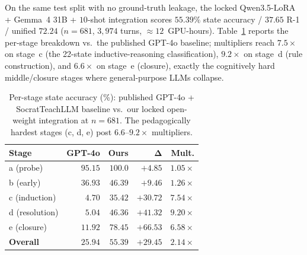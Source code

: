 \documentclass[11pt]{article}
\begin{document}
On the same test split with no ground-truth leakage, the locked Qwen3.5-LoRA + Gemma~4 31B + $10$-shot integration scores $\mathbf{55.39\%}$ state accuracy / $\mathbf{37.65}$ R-1 / unified $\mathbf{72.24}$ ($n{=}681$, $3{,}974$ turns, $\approx 12$~GPU-hours). Table~\ref{tab:perstage} reports the per-stage breakdown vs.\ the published GPT-4o baseline; multipliers reach $\mathbf{7.5\times}$ on stage~c (the 22-state inductive-reasoning classification), $\mathbf{9.2\times}$ on stage~d (rule construction), and $\mathbf{6.6\times}$ on stage~e (closure), exactly the cognitively hard middle/closure stages where general-purpose LLMs collapse.

\begin{table}[t]
  \centering
  \small
  \begin{tabular}{@{}lrrrr@{}}
    \toprule
    \textbf{Stage} & \textbf{GPT-4o} & \textbf{Ours} & $\boldsymbol{\Delta}$ & \textbf{Mult.} \\
    \midrule
    a (probe)       & $95.15$ & $100.0$ & $+4.85$ & $1.05\times$ \\
    b (early)       & $36.93$ & $46.39$ & $+9.46$ & $1.26\times$ \\
    c (induction)   & $\phantom{0}4.70$ & $\mathbf{35.42}$ & $\mathbf{+30.72}$ & $\mathbf{7.54\times}$ \\
    d (resolution)  & $\phantom{0}5.04$ & $\mathbf{46.36}$ & $\mathbf{+41.32}$ & $\mathbf{9.20\times}$ \\
    e (closure)     & $11.92$ & $\mathbf{78.45}$ & $\mathbf{+66.53}$ & $\mathbf{6.58\times}$ \\
    \midrule
    \textbf{Overall} & $\mathbf{25.94}$ & $\mathbf{55.39}$ & $\mathbf{+29.45}$ & $\mathbf{2.14\times}$ \\
    \bottomrule
  \end{tabular}
  \caption{Per-stage state accuracy (\%): published GPT-4o + SocratTeachLLM baseline vs.\ our locked open-weight integration at $n{=}681$. The pedagogically hardest stages (c, d, e) post $6.6$--$9.2\times$ multipliers.}
  \label{tab:perstage}
\end{table}
\end{document}
